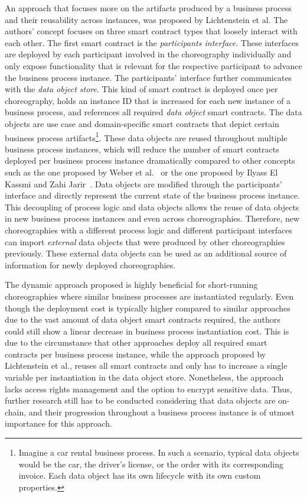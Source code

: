 An approach that focuses more on the artifacts produced by a business process and their reusability across instances, was proposed by Lichtenstein et al. The authors' concept focuses on three smart contract types that loosely interact with each other. The first smart contract is the \textit{participants interface}. These interfaces are deployed by each participant involved in the choreography individually and only expose functionality that is relevant for the respective participant to advance the business process instance. The participants' interface further communicates with the \textit{data object store}. This kind of smart contract is deployed once per choreography, holds an instance ID that is increased for each new instance of a business process, and references all required \textit{data object} smart contracts. The data objects are use case and domain-specific smart contracts that depict certain business process artifacts\footnote{Imagine a car rental business process. In such a scenario, typical data objects would be the car, the driver's license, or the order with its corresponding invoice. Each data object has its own lifecycle with its own custom properties.}. These data objects are reused throughout multiple business process instances, which will reduce the number of smart contracts deployed per business process instance dramatically compared to other concepts such as the one proposed by Weber et al.~\cite{untrusted_bp_execution_using_blockchain} or the one proposed by Ilyass El Kassmi and Zahi Jarir~\cite{bo_collaboration_between_healthcare_providers_covid_19}. Data objects are modified through the participants' interface and directly represent the current state of the business process instance. This decoupling of process logic and data objects allows the reuse of data objects in new business process instances and even across choreographies. Therefore, new choreographies with a different process logic and different participant interfaces can import \textit{external} data objects that were produced by other choreographies previously. These external data objects can be used as an additional source of information for newly deployed choreographies.

The dynamic approach proposed is highly beneficial for short-running choreographies where similar business processes are instantiated regularly. Even though the deployment cost is typically higher compared to similar approaches due to the vast amount of data object smart contracts required, the authors could still show a linear decrease in business process instantiation cost. This is due to the circumstance that other approaches deploy all required smart contracts per business process instance, while the approach proposed by Lichtenstein et al., reuses all smart contracts and only has to increase a single variable per instantiation in the data object store. Nonetheless, the approach lacks access rights management and the option to encrypt sensitive data. Thus, further research still has to be conducted considering that data objects are on-chain, and their progression throughout a business process instance is of utmost importance for this approach.


